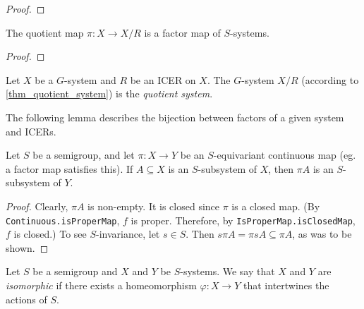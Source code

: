 \begin{proof}
\leanok{}
\end{proof}

\begin{theorem}
\label{theorem_quotient_map_is_factor_map}
\leanok{}
    The quotient map $\pi: X \to X/R$ is a factor map of $S$-systems.
\end{theorem}

\begin{proof}
\end{proof}

\begin{definition}
\label{def_quotient_system}
    Let $X$ be a $G$-system and $R$ be an ICER on $X$.  The $G$-system $X/R$ (according to \cref{thm_quotient_system}) is the \emph{quotient system}.
\end{definition}

The following lemma describes the bijection between factors of a given system and ICERs. 

\begin{lemma}
    \label{lemma_img_of_inv_is_inv}
    \leanok{}
    Let $S$ be a semigroup, and let $\pi: X \to Y$ be an $S$-equivariant continuous map (eg. a factor map satisfies this).  If $A \subseteq X$ is an $S$-subsystem of $X$, then $\pi A$ is an $S$-subsystem of $Y$.
\end{lemma}

\begin{proof}
\leanok{}
    Clearly, $\pi A$ is non-empty.  It is closed since $\pi$ is a closed map.  (By \verb|Continuous.isProperMap|, $f$ is proper. Therefore, by \verb|IsProperMap.isClosedMap|, $f$ is closed.)  To see $S$-invariance, let $s \in S$.  Then $s \pi A = \pi sA \subseteq \pi A$, as was to be shown.
\end{proof}

\begin{definition}
    \label{def_isomorphism}
    \leanok{}
    Let $S$ be a semigroup and $X$ and $Y$ be $S$-systems.  We say that $X$ and $Y$ are \emph{isomorphic} if there exists a homeomorphism $\varphi: X \to Y$ that intertwines the actions of $S$.
\end{definition}

